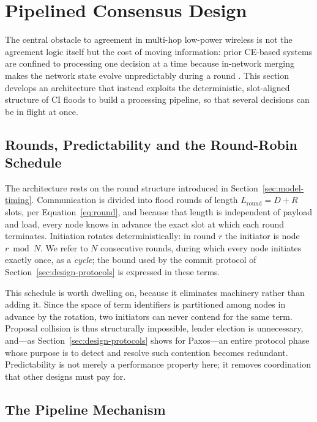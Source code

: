 \documentclass[journal]{IEEEtran}
\newcommand{\CI}{CI}                      %
\newcommand{\CE}{CE}                      %
\newcommand{\Nnodes}{N}                   %
\newcommand{\Diam}{D}                     %
\newcommand{\Nretx}{R}                    %
\newcommand{\Lround}{L_{\mathrm{round}}}  %
\begin{document}
\section{Pipelined Consensus Design}
\label{sec:design}
The central obstacle to agreement in multi-hop low-power wireless is not
the agreement logic itself but the cost of moving information: prior
\CE-based systems are confined to processing one decision at a time
because in-network merging makes the network state evolve
unpredictably during a round \cite{landsiedel13chaos}. This section
develops an architecture that instead exploits the deterministic,
slot-aligned structure of \CI{} floods to build a processing pipeline, so
that several decisions can be in flight at once.

\subsection{Rounds, Predictability and the Round-Robin Schedule}
\label{sec:design-rounds}

The architecture rests on the round structure introduced in
Section~\ref{sec:model-timing}. Communication is divided into flood
rounds of length $\Lround = \Diam + \Nretx$ slots, per
Equation~\eqref{eq:round}, and because that length is independent of
payload and load, every node knows in advance the exact slot at which each
round terminates. Initiation rotates deterministically: in round $r$ the
initiator is node $r \bmod \Nnodes$. We refer to $\Nnodes$ consecutive
rounds, during which every node initiates exactly once, as a
\emph{cycle}; the bound used by the commit protocol of
Section~\ref{sec:design-protocols} is expressed in these terms.

This schedule is worth dwelling on, because it eliminates machinery rather
than adding it. Since the space of term identifiers is partitioned among
nodes in advance by the rotation, two initiators can never contend for the
same term. Proposal collision is thus structurally impossible, leader
election is unnecessary, and---as Section~\ref{sec:design-protocols}
shows for Paxos---an entire protocol phase whose purpose is to detect and
resolve such contention becomes redundant. Predictability is not merely a
performance property here; it removes coordination that other designs must
pay for.

\subsection{The Pipeline Mechanism}
\label{sec:design-pipeline}
\end{document}
